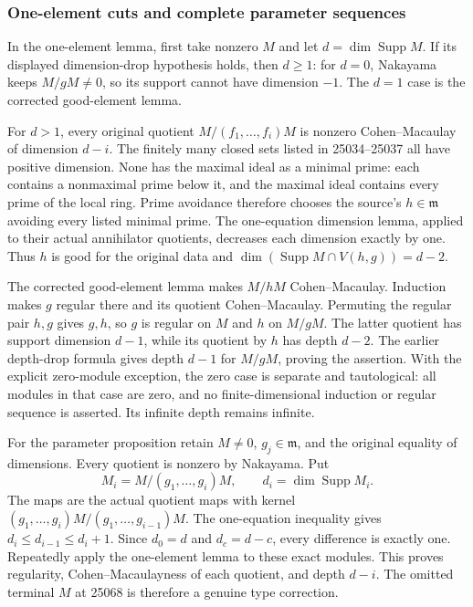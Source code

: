 \subsubsection{One-element cuts and complete parameter sequences}\label{one-element-cuts-and-complete-parameter-sequences}

In the one-element lemma, first take nonzero \(M\) and let \(d=\dim\operatorname{Supp}M\). If its displayed dimension-drop hypothesis holds, then \(d\ge1\): for \(d=0\), Nakayama keeps \(M/gM\ne0\), so its support cannot have dimension \(-1\). The \(d=1\) case is the corrected good-element lemma.

For \(d>1\), every original quotient \(M/(f_1,\ldots,f_i)M\) is nonzero Cohen--Macaulay of dimension \(d-i\). The finitely many closed sets listed in 25034--25037 all have positive dimension. None has the maximal ideal as a minimal prime: each contains a nonmaximal prime below it, and the maximal ideal contains every prime of the local ring. Prime avoidance therefore chooses the source's \(h\in\mathfrak m\) avoiding every listed minimal prime. The one-equation dimension lemma, applied to their actual annihilator quotients, decreases each dimension exactly by one. Thus \(h\) is good for the original data and \(\dim(\operatorname{Supp}M\cap V(h,g))=d-2\).

The corrected good-element lemma makes \(M/hM\) Cohen--Macaulay. Induction makes \(g\) regular there and its quotient Cohen--Macaulay. Permuting the regular pair \(h,g\) gives \(g,h\), so \(g\) is regular on \(M\) and \(h\) on \(M/gM\). The latter quotient has support dimension \(d-1\), while its quotient by \(h\) has depth \(d-2\). The earlier depth-drop formula gives depth \(d-1\) for \(M/gM\), proving the assertion. With the explicit zero-module exception, the zero case is separate and tautological: all modules in that case are zero, and no finite-dimensional induction or regular sequence is asserted. Its infinite depth remains infinite.

For the parameter proposition retain \(M\ne0\), \(g_j\in\mathfrak m\), and the original equality of dimensions. Every quotient is nonzero by Nakayama. Put \[
 M_i=M/(g_1,\ldots,g_i)M,\qquad d_i=\dim\operatorname{Supp}M_i.
\] The maps are the actual quotient maps with kernel \((g_1,\ldots,g_i)M/(g_1,\ldots,g_{i-1})M\). The one-equation inequality gives \(d_i\le d_{i-1}\le d_i+1\). Since \(d_0=d\) and \(d_c=d-c\), every difference is exactly one. Repeatedly apply the one-element lemma to these exact modules. This proves regularity, Cohen--Macaulayness of each quotient, and depth \(d-i\). The omitted terminal \(M\) at 25068 is therefore a genuine type correction.


